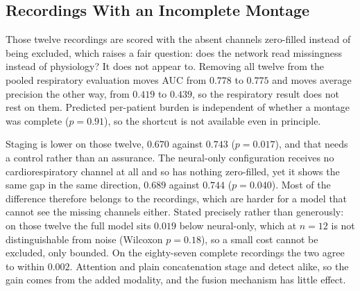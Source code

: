 \documentclass{ieeeaccess}
\begin{document}
\subsection{Recordings With an Incomplete Montage}
Those twelve recordings are scored with the absent channels zero-filled instead of being
excluded, which raises a fair question: does the network read missingness instead of
physiology? It does not appear to. Removing all twelve from the pooled respiratory
evaluation moves AUC from $0.778$ to $0.775$ and moves average precision the other way,
from $0.419$ to $0.439$, so the respiratory result does not rest on them. Predicted
per-patient burden is independent of whether a montage was complete ($p=0.91$), so the
shortcut is not available even in principle.

Staging is lower on those twelve, $0.670$ against $0.743$ ($p=0.017$), and that needs a
control rather than an assurance. The neural-only configuration receives no
cardiorespiratory channel at all and so has nothing zero-filled, yet it shows the same
gap in the same direction, $0.689$ against $0.744$ ($p=0.040$). Most of the difference
therefore belongs to the recordings, which are harder for a model that cannot see the
missing channels either. Stated precisely rather than generously: on those twelve the
full model sits $0.019$ below neural-only, which at $n=12$ is not distinguishable from
noise (Wilcoxon $p=0.18$), so a small cost cannot be excluded, only bounded. On the
eighty-seven complete recordings the two agree to within $0.002$.
Attention and plain concatenation stage and detect alike, so the gain comes from the added
modality, and the fusion mechanism has little effect.
\end{document}

